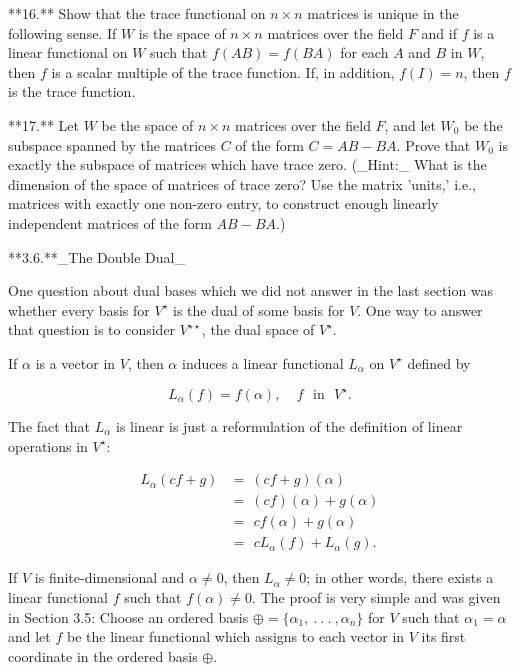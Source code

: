 

**16.** Show that the trace functional on \(n\times n\) matrices is unique in the following sense. If \(W\) is the space of \(n\times n\) matrices over the field \(F\) and if \(f\) is a linear functional on \(W\) such that \(f(AB)=f(BA)\) for each \(A\) and \(B\) in \(W\), then \(f\) is a scalar multiple of the trace function. If, in addition, \(f(I)=n\), then \(f\) is the trace function.

**17.** Let \(W\) be the space of \(n\times n\) matrices over the field \(F\), and let \(W_{0}\) be the subspace spanned by the matrices \(C\) of the form \(C=AB-BA\). Prove that \(W_{0}\) is exactly the subspace of matrices which have trace zero. (_Hint:_ What is the dimension of the space of matrices of trace zero? Use the matrix 'units,' i.e., matrices with exactly one non-zero entry, to construct enough linearly independent matrices of the form \(AB-BA\).)

**3.6.**_The Double Dual_

One question about dual bases which we did not answer in the last section was whether every basis for \(V^{\star}\) is the dual of some basis for \(V\). One way to answer that question is to consider \(V^{\star\star}\), the dual space of \(V^{\star}\).

If \(\alpha\) is a vector in \(V\), then \(\alpha\) induces a linear functional \(L_{\alpha}\) on \(V^{\star}\) defined by

\[L_{\alpha}(f)=f(\alpha),\ \ \ \ \ f\ \ \ \mbox{in}\ \ \ V^{\star}.\]

The fact that \(L_{\alpha}\) is linear is just a reformulation of the definition of linear operations in \(V^{\star}\):

\[\begin{array}{rl}L_{\alpha}(cf+g)&=\ (cf+g)(\alpha)\\ &=\ (cf)(\alpha)+g(\alpha)\\ &=\ \,cf(\alpha)+g(\alpha)\\ &=\ \,cL_{\alpha}(f)+L_{\alpha}(g).\end{array}\]

If \(V\) is finite-dimensional and \(\alpha\neq 0\), then \(L_{\alpha}\neq 0\); in other words, there exists a linear functional \(f\) such that \(f(\alpha)\neq 0\). The proof is very simple and was given in Section 3.5: Choose an ordered basis \(\oplus=\{\alpha_{1},\ .\ .\ .\ ,\alpha_{n}\}\) for \(V\) such that \(\alpha_{1}=\alpha\) and let \(f\) be the linear functional which assigns to each vector in \(V\) its first coordinate in the ordered basis \(\oplus\).


